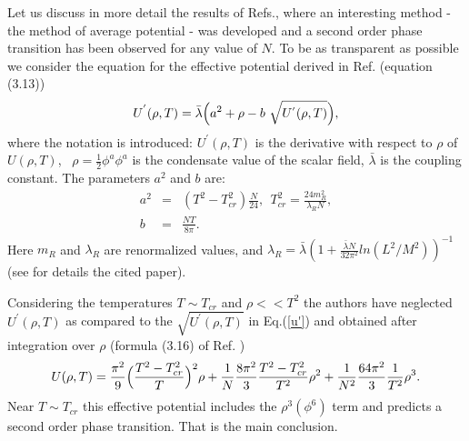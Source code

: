 \documentclass[a4paper,12pt]{article}
\begin{document}
Let us discuss in more detail the results of Refs.\cite{Tetradis},
\cite{Reuter} where an interesting method - the method of average
potential - was developed and a second order phase transition has been
observed for any value of $N$. To be as transparent as possible we
consider the equation for the effective potential derived in
Ref.\cite{Reuter} (equation (3.13))
\begin{equation} \label{u'}
U^{'}(\rho, T) = \bar{\lambda} \Bigl( a^2 + \rho - b~
  \sqrt{U^{'} (\rho, T)} \Bigr),
\end{equation}
where the notation is introduced: $U^{'} (\rho, T)$ is the derivative
with respect to $\rho$ of $U (\rho, T)$,~ $\rho = \frac{1}{2} \phi^a
\phi^a$ is the condensate value of the scalar field, $\bar{\lambda}$
is the coupling constant. The parameters $a^2$ and $b$ are:
\begin{eqnarray} \label{ab}
a^2 &=& ( T^2 - T_{cr}^2) \frac{N}{24},~~ T_{cr}^2 = \frac{24
  m^2_R}{\lambda_R N}, \\ \nonumber
b &=& \frac{NT}{8 \pi}.~~~~~~~~~~~~~~~~~~~~~~~~~~~~~~~
\end{eqnarray}
Here $ m_R$ and $\lambda_R$ are renormalized values, and
$\lambda_R = \bar{\lambda} (1 + \frac{\bar{\lambda}N}{32 \pi^2} ln
(L^2/M^2))^{-1}$ (see for details the cited paper).

Considering the temperatures $T \sim T_{cr}$ and $\rho << T^2$ the
authors have neglected $U^{'}(\rho, T)$ as compared to the
$\sqrt{U^{'} (\rho, T)}$ in Eq.(\ref{u'}) and obtained after
integration over $\rho$ (formula (3.16) of Ref. \cite{Reuter})
\begin{equation} \label{u}
U (\rho, T) = \frac{\pi^2}{9} \Bigl(\frac{T^2 - T_{cr}^2}{T}\Bigr)^2
\rho + \frac{1}{N} \frac{8 \pi^2}{3} \frac{T^2 - T_{cr}^2}{T^2} \rho^2
+ \frac{1}{N^2} \frac{64 \pi^2}{3}\frac{1}{T^2}\rho^3. 
\end{equation}
Near $T \sim  T_{cr}$ this effective potential includes  the  $\rho^3
(\phi^6)$ term and predicts a second order phase transition. That is
the main conclusion.  
\end{document}
